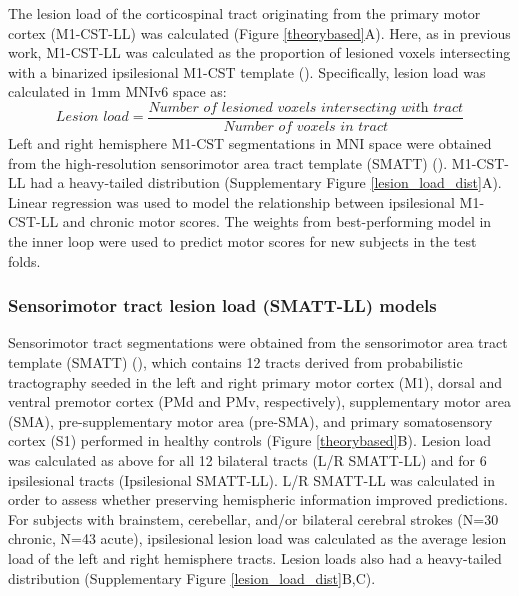 \documentclass[10pt]{article}
\begin{document}
The lesion load of the corticospinal tract originating from the primary motor cortex (M1-CST-LL) was calculated (Figure \ref{theorybased}A). Here, as in previous work, M1-CST-LL was calculated as the proportion of lesioned voxels intersecting with a binarized ipsilesional M1-CST template (\cite{Zhu2010-qh}). Specifically, lesion load was calculated in 1mm MNIv6 space as:
\begin{equation}
    \textit{Lesion load} = \frac{\textit{Number of lesioned voxels intersecting with  tract}}{\textit{Number of voxels in tract}}
\end{equation}
Left and right hemisphere M1-CST segmentations in MNI space were obtained from the high-resolution sensorimotor area tract template (SMATT) (\cite{Archer2018-ti}). M1-CST-LL had a heavy-tailed distribution (Supplementary Figure \ref{lesion_load_dist}A).
Linear regression was used to model the relationship between ipsilesional M1-CST-LL and chronic motor scores. The weights from best-performing model in the inner loop were used to predict motor scores for new subjects in the test folds. 

\subsubsection*{Sensorimotor tract lesion load (SMATT-LL) models}
Sensorimotor tract segmentations were obtained from the sensorimotor area tract template (SMATT) (\cite{Archer2018-ti}), which contains 12 tracts derived from probabilistic tractography seeded in the left and right primary motor cortex (M1), dorsal and ventral premotor cortex (PMd and PMv, respectively), supplementary motor area (SMA), pre-supplementary motor area (pre-SMA), and primary somatosensory cortex (S1) performed in healthy controls (Figure \ref{theorybased}B). Lesion load was calculated as above for all 12 bilateral tracts (L/R SMATT-LL) and for 6 ipsilesional tracts (Ipsilesional SMATT-LL). L/R SMATT-LL was calculated in order to assess whether preserving hemispheric information improved predictions. For subjects with brainstem, cerebellar, and/or bilateral cerebral strokes (N=30 chronic, N=43 acute), ipsilesional lesion load was calculated as the average lesion load of the left and right hemisphere tracts. Lesion loads also had a heavy-tailed distribution (Supplementary Figure \ref{lesion_load_dist}B,C). 
\end{document}
